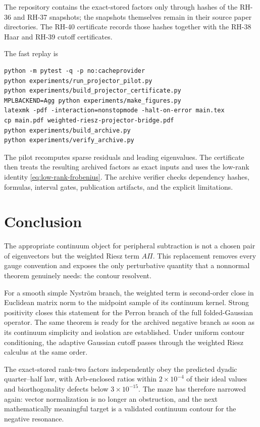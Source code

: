 \documentclass[11pt]{article}
\theoremstyle{definition}
\theoremstyle{remark}
\begin{document}
The repository contains the exact-stored factors only through hashes of the
RH-36 and RH-37 snapshots; the snapshots themselves remain in their source
paper directories.  The RH-40 certificate records those hashes together with
the RH-38 Haar and RH-39 cutoff certificates.

The fast replay is
\begin{verbatim}
python -m pytest -q -p no:cacheprovider
python experiments/run_projector_pilot.py
python experiments/build_projector_certificate.py
MPLBACKEND=Agg python experiments/make_figures.py
latexmk -pdf -interaction=nonstopmode -halt-on-error main.tex
cp main.pdf weighted-riesz-projector-bridge.pdf
python experiments/build_archive.py
python experiments/verify_archive.py
\end{verbatim}

The pilot recomputes sparse residuals and leading eigenvalues.  The
certificate then treats the resulting archived factors as exact inputs and
uses the low-rank identity \eqref{eq:low-rank-frobenius}.  The archive verifier
checks dependency hashes, formulas, interval gates, publication artifacts,
and the explicit limitations.

\section{Conclusion}

The appropriate continuum object for peripheral subtraction is not a chosen
pair of eigenvectors but the weighted Riesz term $A\Pi$.  This replacement
removes every gauge convention and exposes the only perturbative quantity
that a nonnormal theorem genuinely needs: the contour resolvent.

For a smooth simple Nystr\"om branch, the weighted term is second-order close
in Euclidean matrix norm to the midpoint sample of its continuum kernel.
Strong positivity closes this statement for the Perron branch of the full
folded-Gaussian operator.  The same theorem is ready for the archived
negative branch as soon as its continuum simplicity and isolation are
established.  Under uniform contour conditioning, the adaptive Gaussian
cutoff passes through the weighted Riesz calculus at the same order.

The exact-stored rank-two factors independently obey the predicted dyadic
quarter--half law, with Arb-enclosed ratios within $2\times10^{-4}$ of their
ideal values and biorthogonality defects below $3\times10^{-15}$.  The maze
has therefore narrowed again: vector normalization is no longer an
obstruction, and the next mathematically meaningful target is a validated
continuum contour for the negative resonance.



\end{document}
